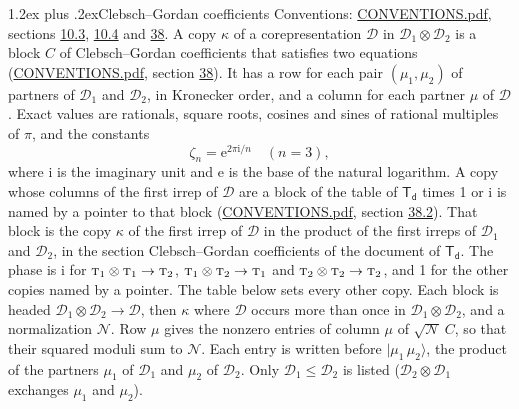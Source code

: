 \documentclass[10pt,a4paper]{article}
\makeatletter
\renewcommand\section{\@startsection{section}{1}{\z@}{-3ex plus -1ex minus -.2ex}%
  {1.2ex plus .2ex}{\normalfont\large\sffamily\bfseries\color{parttitle}}}
\numberwithin{equation}{section}
\newcommand{\grp}[1]{\mathsf{#1}}
\newcommand{\irr}[1]{\text{\normalfont\scshape #1}}
\newcommand{\iunit}{\mathrm{i}}
\newcommand{\expe}{\mathrm{e}}
\newcommand{\rootunity}[1]{\zeta_{#1}}
\newcommand{\irrprod}{\otimes}
\newcommand{\mult}{\kappa}
\newcommand{\intx}{\mu}
\newcommand{\cgnorm}{\mathcal{N}}
\newcommand{\prodket}[2]{\lvert {#1}\,{#2}\rangle}
\makeatother
\begin{document}
\section{Clebsch--Gordan coefficients}\label{s:clebsch_gordan}
Conventions: \href{../../CONVENTIONS.pdf}{CONVENTIONS.pdf}, sections \href{../../../rotation/CONVENTIONS.pdf\#conv.10.3}{10.3}, \href{../../../rotation/CONVENTIONS.pdf\#conv.10.4}{10.4} and \href{../../CONVENTIONS.pdf\#conv.38}{38}.
\leavevmode\label{n:index.copy}\label{n:matrix.cg.stored}A copy $\mult$ of a corepresentation $\mathcal{D}$ in $\mathcal{D}_1\irrprod\mathcal{D}_2$ is a block $C$ of Clebsch--Gordan coefficients that satisfies two equations (\href{../../CONVENTIONS.pdf}{CONVENTIONS.pdf}, section \href{../../CONVENTIONS.pdf\#conv.38}{38}). \label{n:index.cg}It has a row for each pair $(\intx_1, \intx_2)$ of partners of $\mathcal{D}_1$ and $\mathcal{D}_2$, in Kronecker order, and a column for each partner $\intx$ of $\mathcal{D}$.
\leavevmode\label{n:constant.root}\label{n:index.root.order}Exact values are rationals, square roots, cosines and sines of rational multiples of $\pi$, and the constants
\begin{equation}\label{e:constants}\rootunity{n} = \expe^{2\pi\iunit/n}\quad(n = 3),\end{equation}
where $\iunit$ is the imaginary unit and $\expe$ is the base of the natural logarithm.
A copy whose columns of the first irrep of $\mathcal{D}$ are a block of the table of $\grp{T_{d}}$ times 1 or $\iunit$ is named by a pointer to that block (\href{../../CONVENTIONS.pdf}{CONVENTIONS.pdf}, section \href{../../CONVENTIONS.pdf\#conv.38.2}{38.2}). That block is the copy $\mult$ of the first irrep of $\mathcal{D}$ in the product of the first irreps of $\mathcal{D}_1$ and $\mathcal{D}_2$, in the section Clebsch--Gordan coefficients of the document of \href{../../../rotation/data/pdf/Td.pdf}{$\grp{T_{d}}$}. The phase is $\iunit$ for $\irr{t}_{1}\irrprod \irr{t}_{1}\to \irr{t}_{2}$, $\irr{t}_{1}\irrprod \irr{t}_{2}\to \irr{t}_{1}$ and $\irr{t}_{2}\irrprod \irr{t}_{2}\to \irr{t}_{2}$, and 1 for the other copies named by a pointer. The table below sets every other copy.
Each block is headed $\mathcal{D}_1\irrprod\mathcal{D}_2\to\mathcal{D}$, then $\mult$ where $\mathcal{D}$ occurs more than once in $\mathcal{D}_1\irrprod\mathcal{D}_2$, and a normalization $\cgnorm$. Row $\intx$ gives the nonzero entries of column $\intx$ of $\sqrt{\cgnorm}\,C$, so that their squared moduli sum to $\cgnorm$. \label{n:vector.ket.product}Each entry is written before $\prodket{\intx_1}{\intx_2}$, the product of the partners $\intx_1$ of $\mathcal{D}_1$ and $\intx_2$ of $\mathcal{D}_2$. Only $\mathcal{D}_1 \le \mathcal{D}_2$ is listed ($\mathcal{D}_2\irrprod\mathcal{D}_1$ exchanges $\intx_1$ and $\intx_2$).
\end{document}

